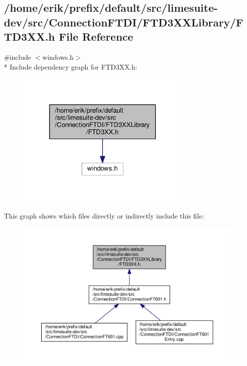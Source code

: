 \subsection{/home/erik/prefix/default/src/limesuite-\/dev/src/\+Connection\+F\+T\+D\+I/\+F\+T\+D3\+X\+X\+Library/\+F\+T\+D3\+XX.h File Reference}
\label{FTD3XX_8h}
{\ttfamily \#include $<$windows.\+h$>$}\\*
Include dependency graph for F\+T\+D3\+X\+X.\+h\+:
\nopagebreak
\begin{figure}[H]
\begin{center}
\leavevmode
\includegraphics[width=242pt]{db/dbe/FTD3XX_8h__incl}
\end{center}
\end{figure}
This graph shows which files directly or indirectly include this file\+:
\nopagebreak
\begin{figure}[H]
\begin{center}
\leavevmode
\includegraphics[width=350pt]{d4/d7c/FTD3XX_8h__dep__incl}
\end{center}
\end{figure}
